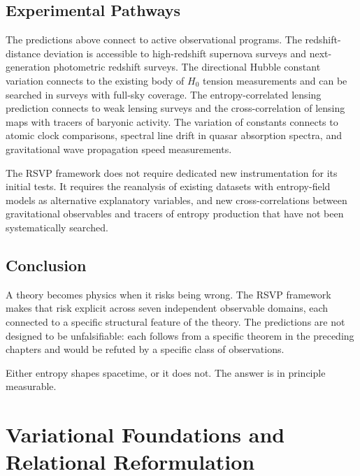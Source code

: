 \documentclass[12pt,a4paper,openany]{book}
\theoremstyle{plain}
\theoremstyle{definition}
\theoremstyle{remark}
\begin{document}
\section{Experimental Pathways}

The predictions above connect to active observational programs. The redshift-distance deviation is accessible to high-redshift supernova surveys and next-generation photometric redshift surveys. The directional Hubble constant variation connects to the existing body of $H_0$ tension measurements and can be searched in surveys with full-sky coverage. The entropy-correlated lensing prediction connects to weak lensing surveys and the cross-correlation of lensing maps with tracers of baryonic activity. The variation of constants connects to atomic clock comparisons, spectral line drift in quasar absorption spectra, and gravitational wave propagation speed measurements.

The RSVP framework does not require dedicated new instrumentation for its initial tests. It requires the reanalysis of existing datasets with entropy-field models as alternative explanatory variables, and new cross-correlations between gravitational observables and tracers of entropy production that have not been systematically searched.

\section{Conclusion}

A theory becomes physics when it risks being wrong. The RSVP framework makes that risk explicit across seven independent observable domains, each connected to a specific structural feature of the theory. The predictions are not designed to be unfalsifiable: each follows from a specific theorem in the preceding chapters and would be refuted by a specific class of observations.

Either entropy shapes spacetime, or it does not. The answer is in principle measurable.



\chapter{Variational Foundations and Relational Reformulation}
\label{chap:variational_foundations}
\end{document}
